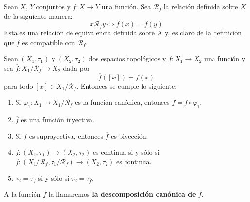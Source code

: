 \documentclass[12pt]{report}
\theoremstyle{largebreak}
\newcommand\cf[3]{\ensuremath{#1:#2\rightarrow#3}}
\begin{document}
    Sean $X$, $Y$ conjuntos y $\cf{f}{X}{Y}$ una función. Sea $\mathcal{R}_f$ la relación definida sobre $X$ de la siguiente manera:
    \begin{equation*}
        x\mathcal{R}_f y\iff f(x)=f(y)
    \end{equation*}
    Esta es una relación de equivalencia definida sobre $X$ y, es claro de la definición que $f$ es compatible con $\mathcal{R}_f$.

    \begin{propo}
        Sean $(X_1,\tau_1)$ y $(X_2,\tau_2)$ dos espacios topológicos y $\cf{f}{X_1}{X_2}$ una función y sea $\cf{\overline{f}}{X_1/\mathcal{R}_f}{X_2}$ dada por
        \begin{equation*}
            \overline{f}([x])=f(x)
        \end{equation*}
        para todo $[x]\in X_1/\mathcal{R}_f$. Entonces se cumple lo siguiente:
        \begin{enumerate}
            \item Si $\cf{\varphi_1}{X_1}{X_1/\mathcal{R}_f}$ es la función canónica, entonces $f=\overline{f}\circ\varphi_1$.
            \item $\overline{f}$ es una función inyectiva.
            \item Si $f$ es suprayectiva, entonces $\overline{f}$ es biyección.
            \item $\cf{f}{(X_1,\tau_1)}{(X_2,\tau_2)}$ es continua si y sólo si $\cf{\overline{f}}{(X_1/\mathcal{R}_f,\tau_1/\mathcal{R}_f)}{(X_2,\tau_2)}$ es continua.
            \item $\tau_2=\tau_f$ si y sólo si $\tau_2=\tau_{\overline{f}}$.
        \end{enumerate}
        A la función $\overline{f}$ la llamaremos \textbf{la descomposición canónica de $f$}.
    \end{propo}
\end{document}
